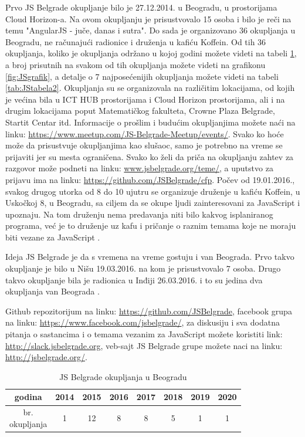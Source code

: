 \documentclass[a4paper]{article}
\begin{document}
{Prvo JS Belgrade okupljanje bilo je 27.12.2014. u Beogradu, u prostorijama Cloud Horizon-a. Na ovom okupljanju je prisustvovalo 15 osoba i bilo je reči na temu "AngularJS - juče, danas i sutra". Do sada je organizovano 36 okupljanja u Beogradu, ne računajući radionice i druženja u kafiću Koffein. Od tih 36 okupljanja, koliko je okupljanja održano u kojoj godini možete videti na tabeli \ref{tab:JStabela1}, a broj prisutnih na svakom od tih okupljanja možete videti na grafikonu \ref{fig:JSgrafik}, a detalje o 7 najposećenijih okupljanja možete videti na tabeli \ref{tab:JStabela2}. Okupljanja su se organizovala na različitim lokacijama, od kojih je većina bila u ICT HUB prostorijama i Cloud Horizon prostorijama, ali i na drugim lokacijama poput Matematičkog fakulteta, Crowne Plaza Belgrade, Startit Centar itd. Informacije o prošlim i budućim okupljanjima možete naći na linku: \url{https://www.meetup.com/JS-Belgrade-Meetup/events/}. Svako ko hoće može da prisustvuje okupljanjima kao slušaoc, samo je potrebno na vreme se prijaviti jer su mesta ograničena. Svako ko želi da priča na okupljanju zahtev za razgovor može podneti na linku: \url{www.jsbelgrade.org/teme/}, a uputstvo za prijavu ima na linku: \url{https://github.com/JSBelgrade/cfp}. Počev od 19.01.2016., svakog drugog utorka od 8 do 10 ujutru  se organizuje druženje u kafiću Koffein, u Uskočkoj 8, u Beogradu, sa ciljem da se okupe ljudi zainteresovani za JavaScript i upoznaju. Na tom druženju nema predavanja niti bilo kakvog isplaniranog programa, već je to druženje uz kafu i pričanje o raznim temama koje ne moraju biti vezane za JavaScript \cite{JS_Belgrade_meetup_events}.

Ideja JS Belgrade je da s vremena na vreme gostuju i van Beograda. Prvo takvo okupljanje je bilo u Nišu 19.03.2016. na kom je prisustvovalo 7 osoba. Drugo takvo okupljanje bila je radionica u Inđiji 26.03.2016. i to su jedina dva okupljanja van Beograda \cite{JS_Belgrade_meetup_events}.

Github repozitorijum na linku: \url{https://github.com/JSBelgrade}, facebook grupa na linku: \url{https://www.facebook.com/jsbelgrade/},
za diskusiju i sva dodatna pitanja o sastancima i o temama vezanim za JavaScript možete koristiti link: \url{http://slack.jsbelgrade.org}, veb-sajt JS Belgrade grupe možete naci na linku: \url{http://jsbelgrade.org/}.

\begin{table}[h!]
\begin{center}
\caption{JS Belgrade okupljanja u Beogradu}
\begin{tabular}{ |c|c|c|c|c|c|c|c| } 
 \hline
 godina & 2014 & 2015 & 2016 & 2017 & 2018 & 2019 & 2020 \\ 
 \hline
 \makecell[c]{br.\\okupljanja} & 1 & 12 & 8 & 8 & 5 & 1 & 1 \\
 \hline
\end{tabular}
\label{tab:JStabela1}
\end{center}
\end{table}

}
\end{document}
